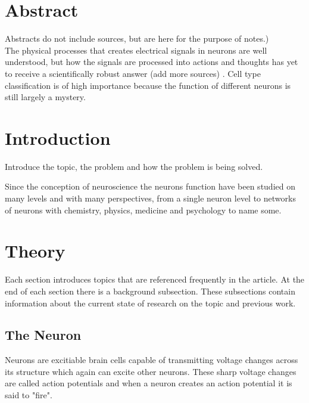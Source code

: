 \documentclass[altfont, fleqn]{uiophd}
\begin{document}
\chapter*{Abstract}
Abstracts do not include sources, but are here for the purpose of notes.) \\

\noindent
The physical processes that creates electrical signals in neurons are well understood, 
but how the signals are processed into actions and thoughts has yet to 
receive a scientifically robust answer
(add more sources) 
\cite{sterratt_principles_2011}. 
Cell type classification is of high importance because the function of different 
neurons is still largely a mystery. 
\setcounter{tocdepth}{1}
\startcontents
\tableofcontents
\chapter{Introduction}
Introduce the topic, the problem and how the problem is being solved. 

Since 
the conception of neuroscience the neurons function have been studied on many levels
and with many perspectives, 
from a single neuron level to networks of neurons with chemistry, physics, medicine
and psychology to name some. 


\chapter{Theory}
Each section introduces topics that are referenced frequently in the article. 
At the end of each section there is a background subsection. 
These subsections contain information
about the current state of research on the topic and previous work. 

\vspace{1em} 
\startcontents
{}
  
\section{The Neuron}
Neurons are excitiable brain cells capable of transmitting voltage changes across its 
structure which again can excite other neurons. These sharp voltage changes are called 
action potentials and when a neuron creates an action potential it is said to "fire".
\end{document}
